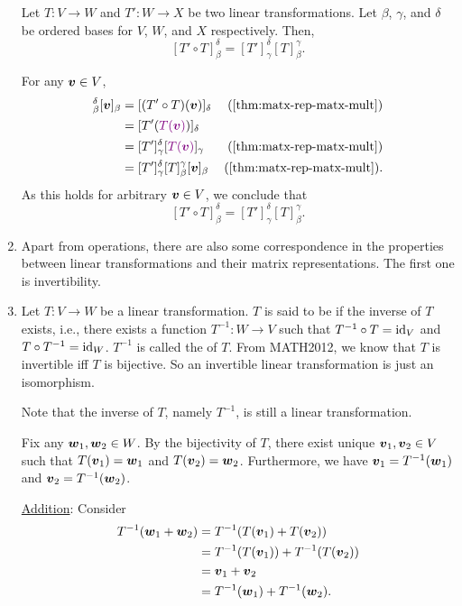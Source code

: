 \begin{enumerate}
\begin{theorem}
\label{thm:lt-compo-matx-mult}
Let \(T:V\to W\) and \(T':W\to X\) be two linear transformations. Let
\(\beta\), \(\gamma\), and \(\delta\) be ordered bases for \(V\), \(W\), and
\(X\) respectively. Then,
\[
[T'\circ T]_{\beta}^{\delta}=[T']_{\gamma}^{\delta}[T]_{\beta}^{\gamma}.
\]
\end{theorem}
\begin{pf}
For any \(\vb*{v}\in V\),
\begin{align*}
[T'\circ T]_{\beta}^{\delta}[\vect{v}]_{\beta}
&=[(T'\circ T)(\vect{v})]_{\delta}&\text{(\Cref{thm:matx-rep-matx-mult})} \\
&=[T'(\vc{T(\vect{v})})]_{\delta} \\
&=[T']_{\gamma}^{\delta}[\vc{T(\vect{v})}]_{\gamma}&\text{(\Cref{thm:matx-rep-matx-mult})} \\
&=[T']_{\gamma}^{\delta}[T]_{\beta}^{\gamma}[\vect{v}]_{\beta}&\text{(\Cref{thm:matx-rep-matx-mult})}.
\end{align*}
As this holds for arbitrary \(\vb*{v}\in V\), we conclude that
\[
[T'\circ T]_{\beta}^{\delta}=[T']_{\gamma}^{\delta}[T]_{\beta}^{\gamma}.
\]
\end{pf}

\item Apart from operations, there are also some correspondence in the
properties between linear transformations and their matrix representations. The
first one is invertibility.

\item Let \(T:V\to W\) be a linear transformation. \(T\) is said to be
 if the inverse of \(T\) exists, i.e., there exists a function
\(T^{-1}:W\to V\) such that \(T^{-1}\circ T=\operatorname{id}_{V}\) and \(T\circ
T^{-1}=\operatorname{id}_{W}\). \(T^{-1}\) is called the  of \(T\). From
MATH2012, we know that \(T\) is invertible iff \(T\) is bijective. So an
invertible linear transformation is just an isomorphism.

Note that the inverse of \(T\), namely \(T^{-1}\), is still a linear
transformation.

\begin{pf}
Fix any \(\vb*{w}_1,\vb*{w}_2\in W\). By the bijectivity of \(T\), there exist unique
\(\vb*{v}_1,\vb*{v}_2\in V\) such that \(T(\vb*{v}_1)=\vb*{w}_1\) and
\(T(\vb*{v}_2)=\vb*{w}_2\). Furthermore, we have
\(\vb*{v}_1=T^{-1}(\vb*{w}_1)\) and \(\vb*{v}_2=T^{-1}(\vb*{w}_2)\).

\underline{Addition}: Consider
\begin{align*}
T^{-1}(\vb*{w}_1+\vb*{w}_2)&=T^{-1}(T(\vb*{v}_1)+T(\vb*{v}_2)) \\
&=T^{-1}(T(\vb*{v}_1))+T^{-1}(T(\vb*{v}_2)) \\
&=\vb*{v}_1+\vb*{v}_2 \\
&=T^{-1}(\vb*{w}_1)+T^{-1}(\vb*{w}_2).
\end{align*}


\end{pf}
\end{enumerate}

